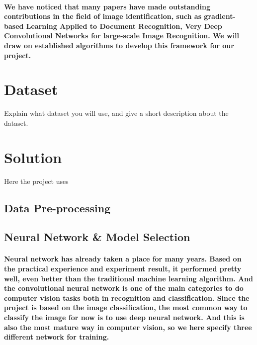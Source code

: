 \documentclass{article}
\begin{document}
\paragraph{We have noticed that many papers have made outstanding contributions in the field of image identification, such as gradient-based Learning Applied to Document Recognition, Very Deep Convolutional Networks for large-scale Image Recognition. We will draw on established algorithms to develop this framework for our project.}



\section*{Dataset}

Explain what dataset you will use, and give a short description about the dataset.




\section*{Solution}

Here the project uses

    \subsection*{Data Pre-processing}
    \paragraph{}

    \subsection*{Neural Network \& Model Selection}
    \paragraph{Neural network has already taken a place for many years. Based on the practical experience and experiment result, it performed pretty well, even better than the traditional machine learning algorithm. And the convolutional neural network is one of the main categories to do computer vision tasks both in recognition and classification. Since the project is based on the image classification, the most common way to classify the image for now is to use deep neural network. And this is also the most mature way in computer vision, so we here specify three different network for training.}
\end{document}
